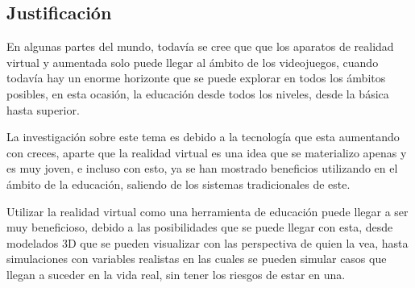 \subsection{Justificación}
En algunas partes del mundo, todavía se cree que que los aparatos de realidad virtual y aumentada solo puede llegar al ámbito de los videojuegos, cuando todavía hay un enorme horizonte que se puede explorar en todos los ámbitos posibles, en esta ocasión, la educación desde todos los niveles, desde la básica hasta superior.

La investigación sobre este tema es debido a la tecnología que esta aumentando con creces, aparte que la realidad virtual es  una idea que se materializo apenas y es muy joven, e incluso con esto, ya se han mostrado beneficios utilizando en el ámbito de la educación, saliendo de los sistemas tradicionales de este.

Utilizar la realidad virtual como una herramienta de educación puede llegar a ser muy beneficioso, debido a las posibilidades que se puede llegar con esta, desde modelados 3D que se pueden visualizar con las perspectiva de quien la vea, hasta simulaciones con variables realistas en las cuales se pueden simular casos que llegan a suceder en la vida real, sin tener los riesgos de estar en una.

